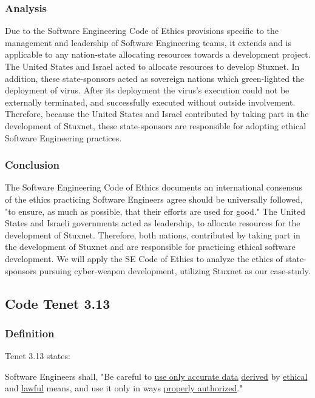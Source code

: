\documentclass[12pt]{article}
\begin{document}
\begin{multicols}{2}
\subsubsection{Analysis}
Due to the Software Engineering Code of Ethics provisions specific to the management and leadership of Software Engineering teams, it extends and is applicable to any nation-state allocating resources towards a development project.\cite{softwareEngineeringCodeOfEthics} The United States and Israel acted to allocate resources to  develop Stuxnet. In addition, these state-sponsors acted as sovereign nations which green-lighted the deployment of virus.\cite{theRealStoryOfStuxnet} After its deployment the virus's execution could not be externally terminated, and successfully executed without outside involvement.\cite{stuxnetFireandForget} Therefore, because the United States and Israel contributed by taking part in the development of Stuxnet, these state-sponsors are responsible for adopting ethical Software Engineering practices.

\subsubsection{Conclusion}

The Software Engineering Code of Ethics documents an international consensus of the ethics practicing Software Engineers agree should be universally followed, "to ensure, as much as possible, that their efforts are used for good."\cite{softwareEngineeringCodeOfEthics} The United States and Israeli governments acted as leadership, to allocate resources for the development of Stuxnet. Therefore, both nations, contributed by taking part in the development of Stuxnet and are responsible for practicing ethical software development. We will apply the SE Code of Ethics to analyze the ethics of state-sponsors pursuing cyber-weapon development, utilizing Stuxnet as our case-study.


\subsection{Code Tenet 3.13}

\subsubsection{Definition}

Tenet 3.13  states:
\begin{framed}
Software Engineers shall, "Be careful to \ul{use only accurate data} \ul{derived} by \ul{ethical} and \ul{lawful} means, and use it only in ways \ul{properly authorized}."\cite{softwareEngineeringCodeOfEthics}
\end{framed}


\end{multicols}
\end{document}
